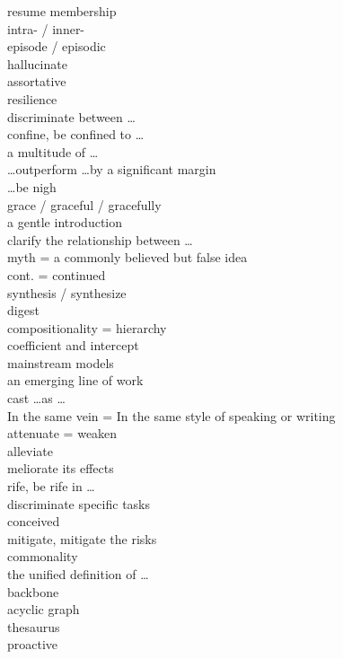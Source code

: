 \documentclass[12pt]{article}
\begin{document}
resume membership \\
intra- / inner- \\
episode / episodic \\
hallucinate \\
assortative \\
resilience \\
discriminate between \dots \\
confine, be confined to \dots \\
a multitude of \dots \\
\dots outperform \dots by a significant margin \\
\dots be nigh \\
grace / graceful / gracefully \\
a gentle introduction \\
clarify the relationship between \dots \\
myth = a commonly believed but false idea \\
cont. = continued \\
synthesis / synthesize \\
digest \\
compositionality = hierarchy \\
coefficient and intercept \\
mainstream models \\
an emerging line of work \\
cast \dots as \dots \\
In the same vein  = In the same style of speaking or writing \\
attenuate = weaken \\
alleviate \\
meliorate its effects \\
rife, be rife in \dots \\
discriminate specific tasks\\
conceived \\
mitigate, mitigate the risks \\
commonality \\
the unified definition of \dots \\
backbone \\
acyclic graph \\
thesaurus\\
proactive \\
\end{document}
